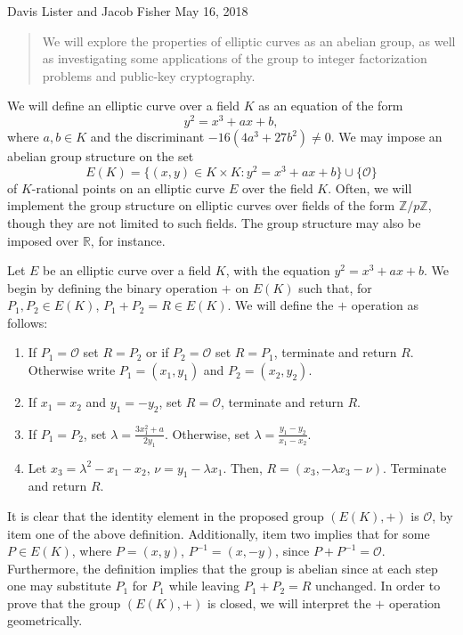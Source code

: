 \documentclass{article}
\begin{document}
\noindent Davis Lister and Jacob Fisher
\newline May 16, 2018

\begin{abstract}
We will explore the properties of elliptic curves as an abelian group, as well as investigating some applications of the group to integer factorization problems and public-key cryptography.
\end{abstract}

We will define an elliptic curve over a field $K$ as an equation of the form 
$$y^2=x^3+ax+b,$$ 
where $a,b \in K$ and the discriminant $-16(4a^3+27b^2) \neq 0$. We may impose an abelian group structure on the set
$$E(K)=\lbrace(x,y) \in K \times K: y^2=x^3+ax+b\rbrace \cup \lbrace \mathcal{O} \rbrace$$
of $K$-rational points on an elliptic curve $E$ over the field $K$. Often, we will implement the group structure on elliptic curves over fields of the form $\mathbb{Z}/p\mathbb{Z}$, though they are not limited to such fields. The group structure may also be imposed over $\mathbb{R}$, for instance.

\indent Let $E$ be an elliptic curve over a field $K$, with the equation $y^2=x^3+ax+b$. We begin by defining the binary operation $+$ on $E(K)$ such that, for $P_1,P_2 \in E(K)$, $P_1 + P_2=R \in E(K)$.  We will define the $+$ operation as follows:
\begin{enumerate}
\item If $P_1=\mathcal{O}$ set $R=P_2$ or if $P_2=\mathcal{O}$ set $R=P_1$, terminate and return $R$. Otherwise write $P_1=(x_1,y_1)$ and $P_2=(x_2,y_2)$.
\item If $x_1=x_2$ and $y_1=-y_2$, set $R=\mathcal{O}$, terminate and return $R$.
\item If $P_1=P_2$, set $\lambda=\frac{3x_1^2+a}{2y_1}$. Otherwise, set $\lambda=\frac{y_1-y_2}{x_1-x_2}$.
\item Let $x_3=\lambda^2-x_1-x_2$, $\nu=y_1-\lambda x_1$. Then, $R=(x_3,-\lambda x_3-\nu)$. Terminate and return $R$.
\end{enumerate} 

\indent It is clear that the identity element in the proposed group $(E(K),+)$ is $\mathcal{O}$, by item one of the above definition. Additionally, item two implies that for some $P \in E(K)$, where $P=(x,y)$, $P^{-1}=(x,-y)$, since $P+P^{-1}=\mathcal{O}$. Furthermore, the definition implies that the group is abelian since at each step one may substitute $P_1$ for $P_1$ while leaving $P_1+P_2=R$ unchanged. In order to prove that the group $(E(K),+)$ is closed, we will interpret the $+$ operation geometrically.
\end{document}
